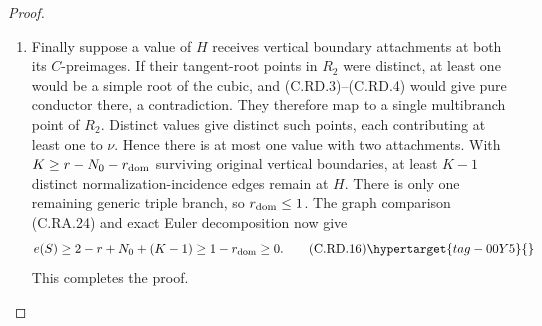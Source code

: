 \begin{proof}
\begin{enumerate}[label={$\langle1\rangle$\arabic*.},leftmargin=*]
\item Finally suppose a value of $H$ receives vertical
boundary attachments at both its $C$-preimages.
If their tangent-root points in $R_2$ were distinct,
at least one would be a simple root of the cubic,
and (C.RD.3)--(C.RD.4) would give pure conductor
there, a contradiction. They therefore map to a
single multibranch point of $R_2$. Distinct values
give distinct such points, each contributing at
least one to $\nu$. Hence there is at most one
value with two attachments. With
$K\ge r-N_0-r_{\rm dom}$ surviving original
vertical boundaries, at least $K-1$ distinct
normalization-incidence edges remain at $H$.
There is only one remaining generic triple branch,
so $r_{\rm dom}\le1$. The graph comparison
(C.RA.24) and exact Euler decomposition now give
\[
 e(S)\ge2-r+N_0+(K-1)
                         \ge1-r_{\rm dom}\ge0.
\tag{C.RD.16}\hypertarget{tag-00Y5}{}\label{cdp:eq:C.RD.16}
\]
This completes the proof.

\end{enumerate}
\end{proof}
